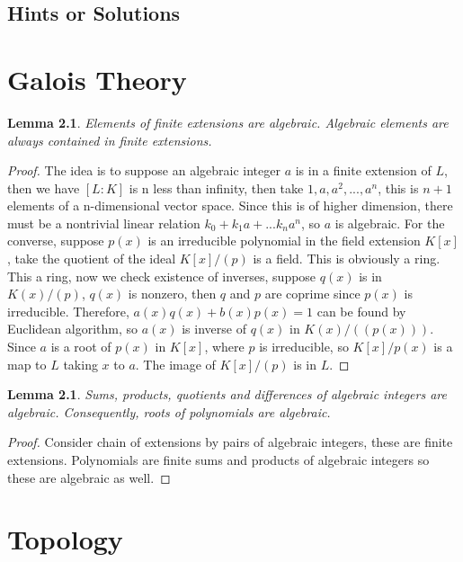 \documentclass{tufte-book}
\newtheorem{lemma}[theorem]{Lemma}
\begin{document}
\section{Hints or Solutions}

\chapter{Galois Theory}

\begin{lemma}
    Elements of finite extensions are algebraic. Algebraic elements are always contained in finite extensions.
\end{lemma}

\begin{proof}
The idea is to suppose an algebraic integer $a$ is in a finite extension of $L$, then we have $[L:K]$ is n less than infinity, then take $1, a, a^2, ..., a^n$, this is $n + 1$ elements of a n-dimensional vector space. Since this is of higher dimension, there must be a nontrivial linear relation $k_0 + k_1 a + ... k_n a^n$, so $a$ is algebraic. For the converse, suppose $p(x)$ is an irreducible polynomial in the field extension $K[x]$, take the quotient of the ideal $K[x]/(p)$ is a field. This is obviously a ring. This a ring, now we check existence of inverses, suppose $q(x)$ is in $K(x)/(p)$, $q(x)$ is nonzero, then $q$ and $p$ are coprime since $p(x)$ is irreducible. Therefore, $a(x)q(x) + b(x) p(x) = 1$ can be found by Euclidean algorithm, so $a(x)$ is inverse of $q(x)$ in $K(x)/((p(x)))$. Since $a$ is a root of $p(x)$ in $K[x]$, where $p$ is irreducible, so $K[x]/p(x)$ is a map to $L$ taking $x$ to $a$. The image of $K[x]/(p)$ is in $L$.
\end{proof}

\begin{lemma}
    Sums, products, quotients and differences of algebraic integers are algebraic. Consequently, roots of polynomials are algebraic.
\end{lemma}

\begin{proof}
    Consider chain of extensions by pairs of algebraic integers, these are finite extensions. Polynomials are finite sums and products of algebraic integers so these are algebraic as well.
\end{proof}

\chapter{Topology}
\end{document}

